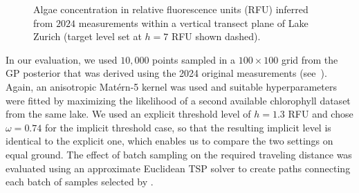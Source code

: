%
\begin{figure}[tb]
  \centering
  \hspace{-0.7em}
  \caption{Algae concentration in relative fluorescence units (RFU)
           inferred from $2024$ measurements within a vertical transect plane
           of Lake Zurich (target level set at $h = 7$ RFU shown dashed).}
  \label{fig:limno_bgape}
\end{figure}

In our evaluation, we used $10,000$ points sampled in a $100 \times 100$ grid
from the GP posterior that was derived using the 2024 original measurements
(see~).
Again, an anisotropic Mat\'{e}rn-5 kernel was used and suitable
hyperparameters were fitted by maximizing the
likelihood of a second available chlorophyll dataset from the same lake.
We used an explicit threshold level of $h = 1.3$ RFU and chose $\omega = 0.74$
for the implicit threshold case, so that the resulting implicit level is
identical to the explicit one, which enables us to compare the two settings on
equal ground.
The effect of batch sampling on the required traveling distance was evaluated
using an approximate Euclidean TSP solver to create paths connecting each
batch of samples selected by \bacl.

